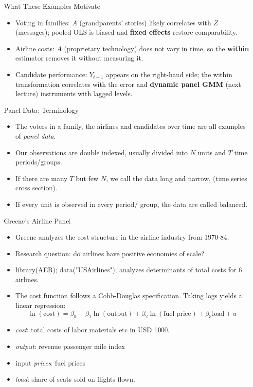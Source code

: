 \documentclass[aspectratio=169, handout]{beamer}
\numberwithin{equation}{section}
\begin{document}
\begin{frame}{What These Examples Motivate}
\begin{itemize}
\item Voting in families: $A$ (grandparents' stories) likely correlates with $Z$ (messages); pooled OLS is biased and \textbf{fixed effects} restore comparability.
\item Airline costs: $A$ (proprietary technology) does not vary in time, so the \textbf{within} estimator removes it without measuring it.
\item Candidate performance: $Y_{t-1}$ appears on the right-hand side; the within transformation correlates with the error and \textbf{dynamic panel GMM} (next lecture) instruments with lagged levels.
\end{itemize}
\end{frame}


\begin{frame}{Panel Data: Terminology}
\begin{itemize}
\item The voters in a family, the airlines and candidates over time are all examples of \emph{panel data}.\pause
\item Our observations are double indexed, usually divided into $N$ units and $T$ time periods/groups. \pause
\item If there are many $T$ but few $N$, we call the data long and narrow, (time series cross section).\pause
\item If every unit is observed in every period/ group, the data are called balanced.
\end{itemize}
\end{frame}

\begin{frame}{Greene's Airline Panel}
\begin{itemize}
\item Greene analyzes the cost structure in the airline industry from 1970-84.
\item Research question: do airlines have positive economies of scale?
\item library(AER); data("USAirlines"); analyzes determinants of total costs for 6 airlines.\pause
\item The cost function follows a Cobb-Douglas specification. Taking logs yields a linear regression:
$$\ln(\text{cost})= \beta_0+\beta_1\ln(\text{output})+\beta_2\ln(\text{fuel price})+\beta_3\text{load}+u$$
\item \emph{cost}: total costs of labor materials etc in USD 1000.
\item \emph{output}: revenue passenger mile index
\item input \emph{prices}: fuel prices
\item \emph{load}: share of seats sold on flights flown.
\end{itemize}
\end{frame}
\end{document}
